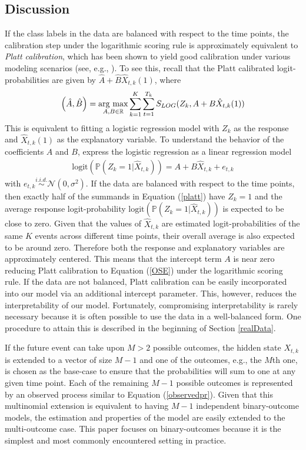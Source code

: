 \documentclass[aoas, preprint]{imsart}
\newcommand{\argmax}{\operatornamewithlimits{arg\ max}}
\numberwithin{equation}{section}
\theoremstyle{plain}
\newcommand{\R}{\mathbb{R}}
\renewcommand{\P}{\mathbb{P}}
\newcommand{\logit}{\text{logit}}
\begin{document}
\subsection{Discussion}
If the class labels in the data are balanced with respect to the time points, the calibration step under the logarithmic scoring rule is approximately equivalent to \textit{Platt calibration}, which has been shown to yield good calibration under various modeling scenarios (see, e.g., \citet{platt1999probabilistic, niculescu2005obtaining}). To see this, recall that the Platt calibrated logit-probabilities are given by $\hat{A} + \hat{B}\hat{X}_{t,k}(1)$, where 
\begin{eqnarray}
\left(\hat{A}, \hat{B} \right) =  \argmax_{A, B \in \R} \sum_{k=1}^K \sum_{t=1}^{T_k}  S_{LOG}(Z_k, A + B\hat{X}_{t,k}(1) ) \label{platt}
\end{eqnarray}
This is equivalent to fitting a logistic regression model with $Z_k$ as the response and $\hat{X}_{t,k}(1)$ as the explanatory variable.
To understand the behavior of the coefficients $A$ and $B$, express the logistic regression as a linear regression model
\begin{eqnarray*}
\logit(\P(Z_k = 1 | \hat{X}_{t,k})) = A + B\hat{X}_{t,k} + e_{t,k}
\end{eqnarray*}
with $e_{t,k} \stackrel{i.i.d.}{\sim} \mathcal{N}(0,\sigma^2)$. If the data are balanced with respect to the time points, then exactly half of the summands in Equation (\ref{platt}) have $Z_k = 1$ and the average response logit-probability $\logit(\P(Z_k = 1 | \hat{X}_{t,k})) $ is expected to be close to zero. Given that the values of $\hat{X}_{t,k}$ are estimated logit-probabilities of the same $K$ events across different time points, their overall average is also expected to be around zero. Therefore both the response and explanatory variables are approximately centered. This means that the intercept term $A$ is near zero reducing Platt calibration to Equation (\ref{OSE}) under the logarithmic scoring rule. If the data are not balanced, Platt calibration can be easily incorporated into our model via an additional intercept parameter. This, however, reduces the interpretability of our model. Fortunately, compromising interpretability is rarely necessary because it is often possible to use the data in a well-balanced form. One procedure to attain this is described in the beginning of Section \ref{realData}.

If the future event can take upon $M > 2$ possible outcomes, the hidden state $X_{t,k}$ is extended to a vector of size $M-1$ and one of the outcomes, e.g., the $M$th one, is chosen as the base-case to ensure that the probabilities will sum to one at any given time point. Each of the remaining  $M-1$ possible outcomes is represented by an observed process similar to Equation (\ref{observedpr}). Given that this multinomial extension is equivalent to having $M-1$ independent binary-outcome models, the estimation and properties of the model are easily extended to the multi-outcome case. This paper focuses on binary-outcomes because it is the simplest and most commonly encountered setting in practice. 
\end{document}
